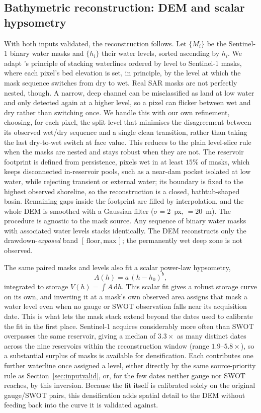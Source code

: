\subsection{Bathymetric reconstruction: DEM and scalar hypsometry}
\label{sec:dem}
With both inputs validated, the reconstruction follows. Let $\{M_i\}$ be the Sentinel-1
binary water masks and $\{h_i\}$ their water levels, sorted ascending by $h_i$. We adapt
\citet{Schwatke2020}'s principle of stacking waterlines ordered by level to Sentinel-1
masks, where each pixel's bed elevation is set, in principle, by the level at which the
mask sequence switches from dry to wet. Real SAR masks are not perfectly nested, though.
A narrow, deep channel can be misclassified as land at low water and only detected again
at a higher level, so a pixel can flicker between wet and dry rather than switching
once. We handle this with our own refinement, choosing, for each pixel, the split level
that minimises the disagreement between its observed wet/dry sequence and a single
clean transition, rather than taking the last dry-to-wet switch at face value. This
reduces to the plain level-slice rule when the masks are nested and stays robust when
they are not. The reservoir footprint is defined from persistence, pixels wet in at
least $15\%$ of masks, which keeps disconnected in-reservoir pools, such as a near-dam
pocket isolated at low water, while rejecting transient or external water; its boundary
is fixed to the highest observed shoreline, so the reconstruction is a closed,
bathtub-shaped basin. Remaining gaps inside the footprint are filled by interpolation,
and the whole DEM is smoothed with a Gaussian filter ($\sigma=2$~px, $=20$~m). The
procedure is agnostic to the mask source. Any sequence of binary water masks with
associated water levels stacks identically. The DEM
reconstructs only the drawdown-\emph{exposed} band $[\,\text{floor},\text{max}\,]$; the
permanently wet deep zone is not observed.

The same paired masks and levels also fit a scalar power-law hypsometry,
\begin{equation}
  A(h) = a\,(h-h_0)^{b},
\label{eq:powerlaw}
\end{equation}
integrated to storage $V(h)=\int A\,\mathrm{d}h$. This scalar fit gives a robust storage
curve on its own, and inverting it at a mask's own observed area assigns that mask a
water level even when no gauge or SWOT observation falls near its acquisition date.
This is what lets the mask stack extend beyond the dates used to calibrate the fit in
the first place. Sentinel-1 acquires considerably more often than SWOT overpasses the
same reservoir, giving a median of $3.3\times$ as many distinct dates across the nine
reservoirs within the reconstruction window (range $1.9$--$5.8\times$), so a substantial
surplus of masks is available for densification. Each contributes one further waterline
once assigned a level, either directly by the same source-priority rule as
Section~\ref{sec:inputvalid}, or, for the few dates neither gauge nor SWOT reaches, by
this inversion. Because the fit itself is calibrated solely on the original gauge/SWOT
pairs, this densification adds spatial detail to the DEM without feeding back into the
curve it is validated against.

